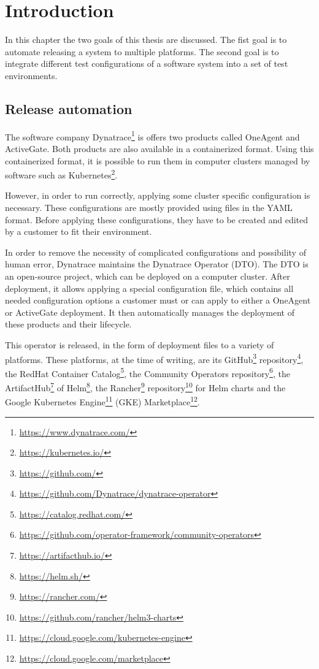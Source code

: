 \chapter{Introduction}
\label{ch:introduction}

In this chapter the two goals of this thesis are discussed.
The fist goal is to automate releasing a system to multiple platforms.
The second goal is to integrate different test configurations of a software system into a set of test environments.

\section{Release automation}
\label{sec:introduction:release-automation}

The software company Dynatrace\footnote{\url{https://www.dynatrace.com/}} is offers two products called OneAgent and ActiveGate.
Both products are also available in a containerized format.
Using this containerized format, it is possible to run them in computer clusters managed by software such as Kubernetes\footnote{\url{https://kubernetes.io/}}.

However, in order to run correctly, applying some cluster specific configuration is necessary.
These configurations are mostly provided using files in the YAML format\cite{UnderstandingKubernetesObjects}.
Before applying these configurations, they have to be created and edited by a customer to fit their environment.

In order to remove the necessity of complicated configurations and possibility of human error, Dynatrace maintains the Dynatrace Operator (DTO).
The DTO is an open-source project, which can be deployed on a computer cluster.
After deployment, it allows applying a special configuration file, which contains all needed configuration options a customer must or can apply to either a OneAgent or ActiveGate deployment.
It then automatically manages the deployment of these products and their lifecycle.

This operator\cite{OperatorPattern} is released, in the form of deployment files to a variety of platforms.
These platforms, at the time of writing, are
its GitHub\footnote{\url{https://github.com/}} repository\footnote{\url{https://github.com/Dynatrace/dynatrace-operator}},
the RedHat Container Catalog\footnote{\url{https://catalog.redhat.com/}},
the Community Operators repository\footnote{\url{https://github.com/operator-framework/community-operators}},
the ArtifactHub\footnote{\url{https://artifacthub.io/}} of Helm\footnote{\url{https://helm.sh/}},
the Rancher\footnote{\url{https://rancher.com/}} repository\footnote{\url{https://github.com/rancher/helm3-charts}} for Helm charts and
the Google Kubernetes Engine\footnote{\url{https://cloud.google.com/kubernetes-engine}} (GKE) Marketplace\footnote{\url{https://cloud.google.com/marketplace}}.

